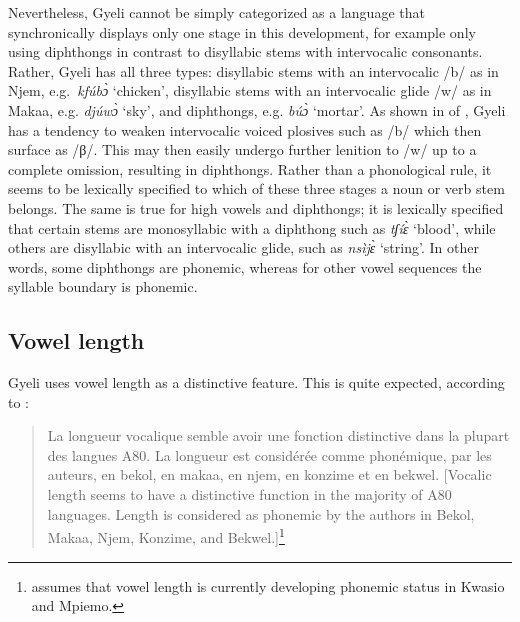 Nevertheless, Gyeli cannot be simply categorized as a language that synchronically displays only one stage in this development, for example only using diphthongs in contrast to disyllabic stems with intervocalic consonants. Rather, Gyeli has all three types: disyllabic stems with an intervocalic /b/ as in Njem, e.g.\ {\itshape kfúbɔ̀} `chicken', disyllabic stems with an intervocalic glide /w/ as in Makaa, e.g. {\itshape djúwɔ̀} `sky', and diphthongs, e.g. {\itshape búɔ̀} `mortar'. As shown in  of , Gyeli has a tendency to weaken intervocalic voiced plosives such as /b/ which then surface as /β/.  This may then easily undergo further lenition to /w/ up to a complete omission, resulting in diphthongs. Rather than a phonological rule, it seems to be lexically specified to which of these three stages a noun or verb stem belongs. The same is true for high vowels and diphthongs; it is lexically specified that certain stems are monosyllabic with a diphthong such as {\itshape tʃíɛ̀} `blood', while others are disyllabic with an intervocalic glide, such as {\itshape nsìjɛ̀} `string'. In other words, some diphthongs are phonemic, whereas for other vowel sequences the syllable boundary is phonemic. 




\subsection{Vowel length}
\label{sec:VLength}

Gyeli uses vowel length as a distinctive feature. This is quite expected, according to \citet[327]{cheucle2014}:
\begin{quote} 
La longueur vocalique semble avoir une fonction distinctive dans la plupart des langues A80. La longueur est considérée comme phonémique, par les auteurs, en bekol, en makaa, en njem, en konzime et en bekwel. [Vocalic length seems to have a distinctive function in the majority of A80 languages. Length is considered as phonemic by the authors in Bekol, Makaa, Njem, Konzime, and Bekwel.]\footnote{\citet[327]{cheucle2014} assumes that vowel length is currently developing phonemic status in Kwasio and Mpiemo.}
\end{quote}

